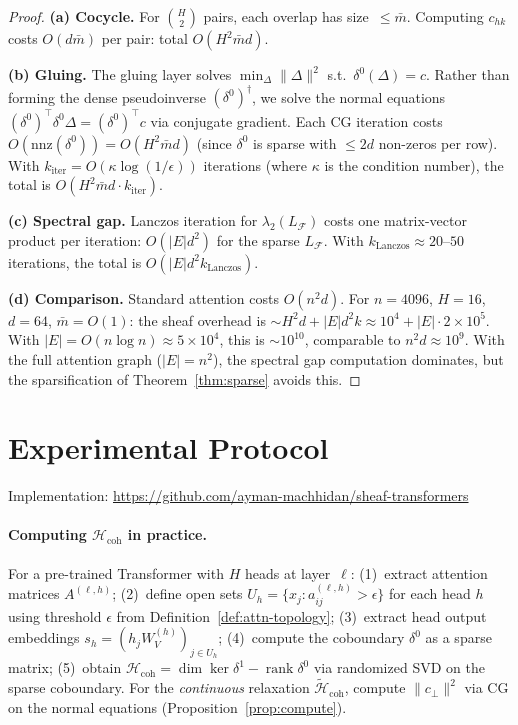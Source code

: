 \documentclass[11pt,a4paper]{article}
\theoremstyle{plain}
\theoremstyle{definition}
\theoremstyle{remark}
\newcommand{\cF}{\mathcal{F}}
\newcommand{\cH}{\mathcal{H}}
\newcommand{\Hcoh}{\mathcal{H}_{\mathrm{coh}}}
\DeclareMathOperator{\rank}{rank}
\begin{document}
\begin{proof}
\textbf{(a) Cocycle.} For $\binom{H}{2}$ pairs, each overlap has size~$\leq \bar{m}$. Computing $c_{hk}$ costs $O(d\bar{m})$ per pair: total $O(H^2 \bar{m} d)$.

\textbf{(b) Gluing.} The gluing layer solves $\min_\Delta \|\Delta\|^2$ s.t.\ $\delta^0(\Delta) = c$. Rather than forming the dense pseudoinverse $(\delta^0)^\dagger$, we solve the normal equations $(\delta^0)^\top \delta^0 \Delta = (\delta^0)^\top c$ via conjugate gradient. Each CG iteration costs $O(\mathrm{nnz}(\delta^0)) = O(H^2 \bar{m} d)$ (since $\delta^0$ is sparse with $\leq 2d$ non-zeros per row). With $k_{\mathrm{iter}} = O(\kappa \log(1/\epsilon))$ iterations (where $\kappa$ is the condition number), the total is $O(H^2 \bar{m} d \cdot k_{\mathrm{iter}})$.

\textbf{(c) Spectral gap.} Lanczos iteration for $\lambda_2(L_\cF)$ costs one matrix-vector product per iteration: $O(|E| d^2)$ for the sparse $L_\cF$. With $k_{\mathrm{Lanczos}} \approx 20$--$50$ iterations, the total is $O(|E| d^2 k_{\mathrm{Lanczos}})$.

\textbf{(d) Comparison.} Standard attention costs $O(n^2 d)$. For $n = 4096$, $H = 16$, $d = 64$, $\bar{m} = O(1)$: the sheaf overhead is $\sim H^2 d + |E| d^2 k \approx 10^4 + |E| \cdot 2 \times 10^5$. With $|E| = O(n\log n) \approx 5 \times 10^4$, this is $\sim 10^{10}$, comparable to $n^2 d \approx 10^9$. With the full attention graph ($|E| = n^2$), the spectral gap computation dominates, but the sparsification of Theorem~\ref{thm:sparse} avoids this.
\end{proof}

\section{Experimental Protocol}\label{sec:experiments}

Implementation: \url{https://github.com/ayman-machhidan/sheaf-transformers}

\paragraph{Computing $\Hcoh$ in practice.}
For a pre-trained Transformer with $H$ heads at layer~$\ell$: (1)~extract attention matrices $A^{(\ell,h)}$; (2)~define open sets $U_h = \{x_j : a_{ij}^{(\ell,h)} > \epsilon\}$ for each head $h$ using threshold $\epsilon$ from Definition~\ref{def:attn-topology}; (3)~extract head output embeddings $s_h = (h_j W_V^{(h)})_{j \in U_h}$; (4)~compute the coboundary $\delta^0$ as a sparse matrix; (5)~obtain $\Hcoh = \dim\ker\delta^1 - \rank\delta^0$ via randomized SVD on the sparse coboundary. For the \emph{continuous} relaxation $\widetilde{\cH}_{\mathrm{coh}}$, compute $\|c_\perp\|^2$ via CG on the normal equations (Proposition~\ref{prop:compute}).
\end{document}
